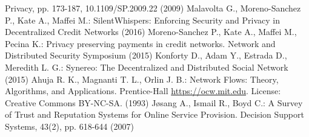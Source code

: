 \begin{thebibliography}{40}
  Privacy, pp. 173-187, 10.1109/SP.2009.22 (2009)
  Malavolta G., Moreno-Sanchez P., Kate A.,  Maffei M.: SilentWhispers: Enforcing Security and Privacy in Decentralized
  Credit Networks (2016)
  Moreno-Sanchez P., Kate A., Maffei M., Pecina K.: Privacy preserving payments in credit networks. Network and
  Distributed Security Symposium (2015)
  Konforty D., Adam Y., Estrada D., Meredith L. G.: Synereo: The Decentralized and Distributed Social Network (2015)
  Ahuja R. K., Magnanti T. L., Orlin J. B.: Network Flows: Theory, Algorithms, and Applications. Prentice-Hall
  \url{https://ocw.mit.edu}. License: Creative Commons BY-NC-SA. (1993)
  J\o{}sang A., Ismail R., Boyd C.: A Survey of Trust and Reputation Systems for Online Service Provision. Decision
  Support Systems, 43(2), pp. 618-644 (2007)
\end{thebibliography}

